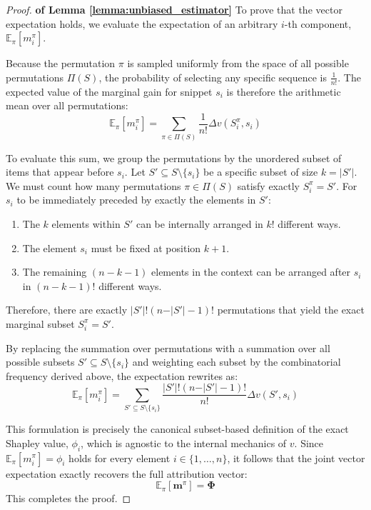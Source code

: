 \documentclass{article}
\newenvironment{proofof}[1]{\begin{proof}\textbf{of {#1}}}{\end{proof}}
\begin{document}
\begin{proofof}{Lemma \ref{lemma:unbiased_estimator}}
To prove that the vector expectation holds, we evaluate the expectation of an arbitrary $i$-th component, $\mathbb{E}_{\pi}[m_i^\pi]$. 

Because the permutation $\pi$ is sampled uniformly from the space of all possible permutations $\Pi(S)$, the probability of selecting any specific sequence is $\frac{1}{n!}$. The expected value of the marginal gain for snippet $s_i$ is therefore the arithmetic mean over all permutations:
$$ \mathbb{E}_{\pi}[m_i^\pi] = \sum_{\pi \in \Pi(S)} \frac{1}{n!} \Delta v(S_i^\pi, s_i) $$

To evaluate this sum, we group the permutations by the unordered subset of items that appear before $s_i$. Let $S' \subseteq S \setminus \{s_i\}$ be a specific subset of size $k = \vert S' \vert$. We must count how many permutations $\pi \in \Pi(S)$ satisfy exactly $S_i^\pi = S'$. 
For $s_i$ to be immediately preceded by exactly the elements in $S'$:
\begin{enumerate}
    \item The $k$ elements within $S'$ can be internally arranged in $k!$ different ways.
    \item The element $s_i$ must be fixed at position $k + 1$.
    \item The remaining $(n - k - 1)$ elements in the context can be arranged after $s_i$ in $(n - k - 1)!$ different ways.
\end{enumerate}
Therefore, there are exactly $\vert S' \vert! (n - \vert S' \vert - 1)!$ permutations that yield the exact marginal subset $S_i^\pi = S'$.

By replacing the summation over permutations with a summation over all possible subsets $S' \subseteq S \setminus \{s_i\}$ and weighting each subset by the combinatorial frequency derived above, the expectation rewrites as:
$$ \mathbb{E}_{\pi}[m_i^\pi] = \sum_{S' \subseteq S \setminus \{s_i\}} \frac{\vert S' \vert! (n - \vert S' \vert - 1)!}{n!} \Delta v(S', s_i) $$

This formulation is precisely the canonical subset-based definition of the exact Shapley value, $\phi_i$, which is agnostic to the internal mechanics of $v$. Since $\mathbb{E}_{\pi}[m_i^\pi] = \phi_i$ holds for every element $i \in \{1, \dots, n\}$, it follows that the joint vector expectation exactly recovers the full attribution vector:
$$ \mathbb{E}_{\pi}[\mathbf{m}^\pi] = \mathbf{\Phi} $$
This completes the proof.
\end{proofof}
\end{document}
